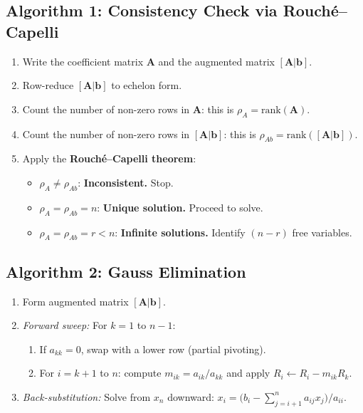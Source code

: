 \documentclass[12pt,a4paper]{article}
\begin{document}
\subsection*{Algorithm 1: Consistency Check via Rouch\'{e}--Capelli}

\begin{enumerate}[leftmargin=2em,label=\textbf{Step \arabic*.}]
  \item Write the coefficient matrix $\mathbf{A}$ and the augmented matrix $[\mathbf{A}|\mathbf{b}]$.
  \item Row-reduce $[\mathbf{A}|\mathbf{b}]$ to echelon form.
  \item Count the number of non-zero rows in $\mathbf{A}$: this is $\rho_A = \text{rank}(\mathbf{A})$.
  \item Count the number of non-zero rows in $[\mathbf{A}|\mathbf{b}]$: this is $\rho_{Ab} = \text{rank}([\mathbf{A}|\mathbf{b}])$.
  \item Apply the \textbf{Rouch\'{e}--Capelli theorem}:
    \begin{itemize}[leftmargin=1.5em]
      \item $\rho_A \neq \rho_{Ab}$: \textbf{Inconsistent.} Stop.
      \item $\rho_A = \rho_{Ab} = n$: \textbf{Unique solution.} Proceed to solve.
      \item $\rho_A = \rho_{Ab} = r < n$: \textbf{Infinite solutions.} Identify $(n-r)$ free variables.
    \end{itemize}
\end{enumerate}

\subsection*{Algorithm 2: Gauss Elimination}

\begin{enumerate}[leftmargin=2em,label=\textbf{Step \arabic*.}]
  \item Form augmented matrix $[\mathbf{A}|\mathbf{b}]$.
  \item \textit{Forward sweep:} For $k = 1$ to $n-1$:
    \begin{enumerate}[label=(\alph*)]
      \item If $a_{kk} = 0$, swap with a lower row (partial pivoting).
      \item For $i = k+1$ to $n$: compute $m_{ik} = a_{ik}/a_{kk}$ and apply
            $R_i \leftarrow R_i - m_{ik} R_k$.
    \end{enumerate}
  \item \textit{Back-substitution:} Solve from $x_n$ downward:
        $x_i = \bigl(b_i - \sum_{j=i+1}^n a_{ij} x_j\bigr) / a_{ii}$.
\end{enumerate}
\end{document}
